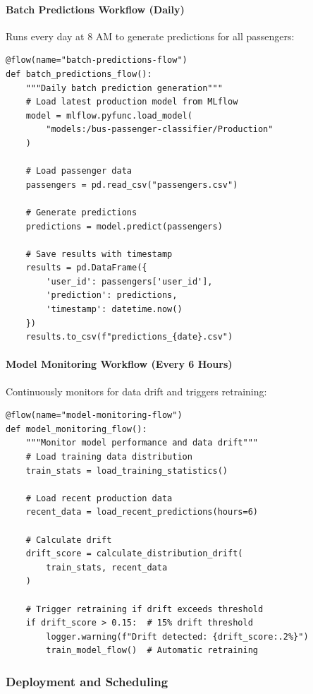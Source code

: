 \paragraph{Batch Predictions Workflow (Daily)}
Runs every day at 8 AM to generate predictions for all passengers:

\begin{lstlisting}[style=python, caption=Predictions Workflow]
@flow(name="batch-predictions-flow")
def batch_predictions_flow():
    """Daily batch prediction generation"""
    # Load latest production model from MLflow
    model = mlflow.pyfunc.load_model(
        "models:/bus-passenger-classifier/Production"
    )
    
    # Load passenger data
    passengers = pd.read_csv("passengers.csv")
    
    # Generate predictions
    predictions = model.predict(passengers)
    
    # Save results with timestamp
    results = pd.DataFrame({
        'user_id': passengers['user_id'],
        'prediction': predictions,
        'timestamp': datetime.now()
    })
    results.to_csv(f"predictions_{date}.csv")
\end{lstlisting}

\paragraph{Model Monitoring Workflow (Every 6 Hours)}
Continuously monitors for data drift and triggers retraining:

\begin{lstlisting}[style=python, caption=Monitoring Workflow]
@flow(name="model-monitoring-flow")
def model_monitoring_flow():
    """Monitor model performance and data drift"""
    # Load training data distribution
    train_stats = load_training_statistics()
    
    # Load recent production data
    recent_data = load_recent_predictions(hours=6)
    
    # Calculate drift
    drift_score = calculate_distribution_drift(
        train_stats, recent_data
    )
    
    # Trigger retraining if drift exceeds threshold
    if drift_score > 0.15:  # 15% drift threshold
        logger.warning(f"Drift detected: {drift_score:.2%}")
        train_model_flow()  # Automatic retraining
\end{lstlisting}

\subsubsection{Deployment and Scheduling}

